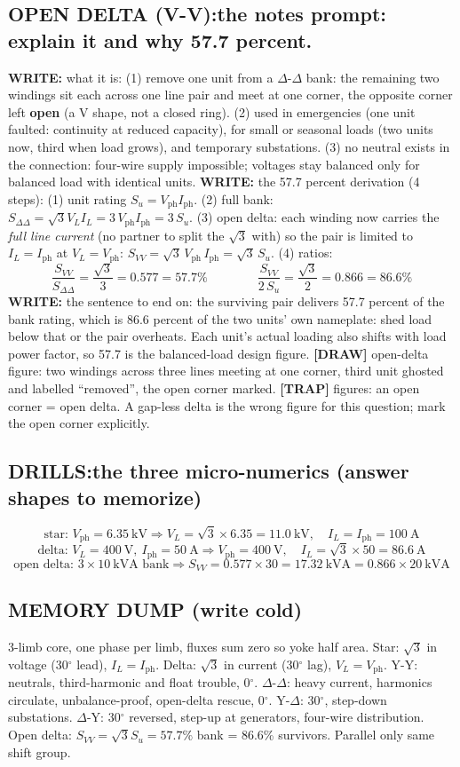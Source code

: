 \documentclass[11pt]{article}
\newcommand{\q}[2]{\subsection*{\color{copper}#1\quad\color{iron}#2}}
\newcommand{\w}[1]{\textbf{\color{copper}WRITE:} #1}
\newcommand{\tr}[1]{\textbf{\color{red}[TRAP]} #1}
\newcommand{\dw}[1]{\textbf{\color{muted}[DRAW]} #1}
\begin{document}
\q{OPEN DELTA (V-V):}{the notes prompt: explain it and why 57.7 percent.}
\w{what it is:} (1) remove one unit from a $\Delta$-$\Delta$ bank: the remaining two windings sit each across one line pair and meet at one corner, the opposite corner left \textbf{open} (a V shape, not a closed ring). (2) used in emergencies (one unit faulted: continuity at reduced capacity), for small or seasonal loads (two units now, third when load grows), and temporary substations. (3) no neutral exists in the connection: four-wire supply impossible; voltages stay balanced only for balanced load with identical units.
\w{the 57.7 percent derivation (4 steps):} (1) unit rating $S_u = V_{\text{ph}} I_{\text{ph}}$. (2) full bank: $S_{\Delta\Delta} = \sqrt{3} V_L I_L = 3\, V_{\text{ph}} I_{\text{ph}} = 3\, S_u$. (3) open delta: each winding now carries the \emph{full line current} (no partner to split the $\sqrt{3}$ with) so the pair is limited to $I_L = I_{\text{ph}}$ at $V_L = V_{\text{ph}}$: $S_{VV} = \sqrt{3}\, V_{\text{ph}}\, I_{\text{ph}} = \sqrt{3}\, S_u$. (4) ratios:
\[
\dfrac{S_{VV}}{S_{\Delta\Delta}} = \dfrac{\sqrt{3}}{3} = 0.577 = 57.7\%
\qquad\qquad
\dfrac{S_{VV}}{2\, S_u} = \dfrac{\sqrt{3}}{2} = 0.866 = 86.6\%
\]
\w{the sentence to end on:} the surviving pair delivers 57.7 percent of the bank rating, which is 86.6 percent of the two units' own nameplate: shed load below that or the pair overheats. Each unit's actual loading also shifts with load power factor, so 57.7 is the balanced-load design figure.
\dw{open-delta figure: two windings across three lines meeting at one corner, third unit ghosted and labelled ``removed'', the open corner marked.}
\tr{figures: an open corner = open delta. A gap-less delta is the wrong figure for this question; mark the open corner explicitly.}

\q{DRILLS:}{the three micro-numerics (answer shapes to memorize)}
\[
\text{star: } V_{\text{ph}} = 6.35\ \text{kV} \Rightarrow V_L = \sqrt{3} \times 6.35 = 11.0\ \text{kV},\quad I_L = I_{\text{ph}} = 100\ \text{A}
\]
\[
\text{delta: } V_L = 400\ \text{V},\ I_{\text{ph}} = 50\ \text{A} \Rightarrow V_{\text{ph}} = 400\ \text{V},\quad I_L = \sqrt{3} \times 50 = 86.6\ \text{A}
\]
\[
\text{open delta: } 3 \times 10\ \text{kVA bank} \Rightarrow S_{VV} = 0.577 \times 30 = 17.32\ \text{kVA} = 0.866 \times 20\ \text{kVA}
\]

\subsection*{\color{copper}MEMORY DUMP (write cold)}
3-limb core, one phase per limb, fluxes sum zero so yoke half area. Star: $\sqrt{3}$ in voltage (30$^\circ$ lead), $I_L = I_{\text{ph}}$. Delta: $\sqrt{3}$ in current (30$^\circ$ lag), $V_L = V_{\text{ph}}$. Y-Y: neutrals, third-harmonic and float trouble, 0$^\circ$. $\Delta$-$\Delta$: heavy current, harmonics circulate, unbalance-proof, open-delta rescue, 0$^\circ$. Y-$\Delta$: 30$^\circ$, step-down substations. $\Delta$-Y: 30$^\circ$ reversed, step-up at generators, four-wire distribution. Open delta: $S_{VV} = \sqrt{3} S_u = 57.7\%$ bank = 86.6\% survivors. Parallel only same shift group.
\end{document}
